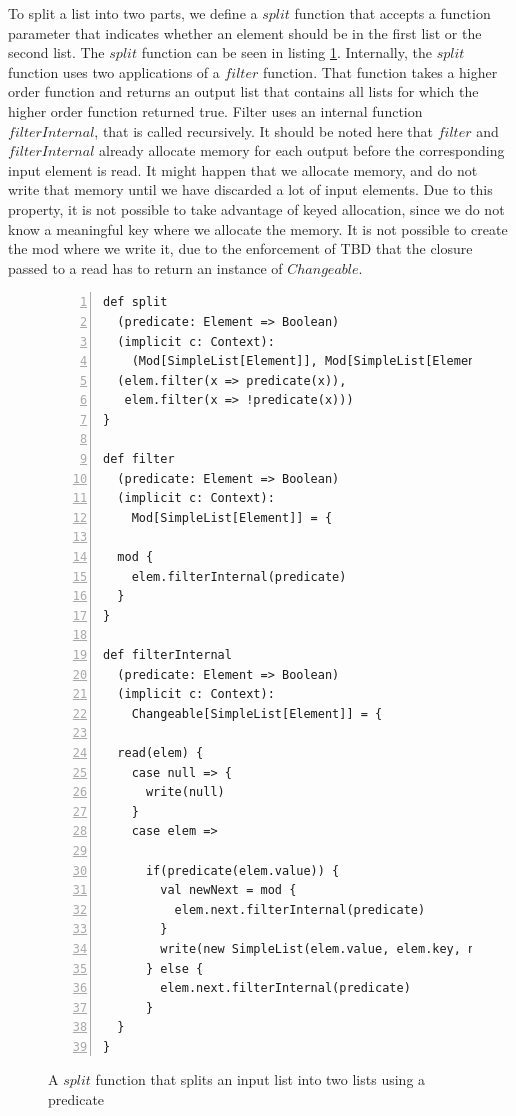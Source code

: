 To split a list into two parts, we define a $split$ function that accepts a function parameter that indicates whether an element should be in the first list or the second list. The $split$ function can be seen in listing \ref{code:split_filter}. Internally, the $split$ function uses two applications of a $filter$ function. That function takes a higher order function and returns an output list that contains all lists for which the higher order function returned true. Filter uses an internal function $filterInternal$, that is called recursively. It should be noted here that $filter$ and $filterInternal$ already allocate memory for each output before the corresponding input element is read. It might happen that we allocate memory, and do not write that memory until we have discarded a lot of input elements. Due to this property, it is not possible to take advantage of keyed allocation, since we do not know a meaningful key where we allocate the memory. It is not possible to create the mod where we write it, due to the enforcement of TBD that the closure passed to a read has to return an instance of $Changeable$. 

\begin{figure}
\begin{lstlisting}[frame=single,basicstyle=\ttfamily,numbers=left,mathescape=true]
def split
  (predicate: Element => Boolean)
  (implicit c: Context):
    (Mod[SimpleList[Element]], Mod[SimpleList[Element]]) = {
  (elem.filter(x => predicate(x)), 
   elem.filter(x => !predicate(x)))
}

def filter
  (predicate: Element => Boolean)
  (implicit c: Context):
    Mod[SimpleList[Element]] = {

  mod {
    elem.filterInternal(predicate)
  }
}

def filterInternal
  (predicate: Element => Boolean)
  (implicit c: Context):
    Changeable[SimpleList[Element]] = {

  read(elem) {
    case null => {
      write(null)
    }
    case elem =>

      if(predicate(elem.value)) {
        val newNext = mod {
          elem.next.filterInternal(predicate)
        }
        write(new SimpleList(elem.value, elem.key, newNext))
      } else {
        elem.next.filterInternal(predicate)
      }
  }
}

\end{lstlisting}
\caption{A $split$ function that splits an input list into two lists using a predicate}
\label{code:split_filter}
\end{figure}

